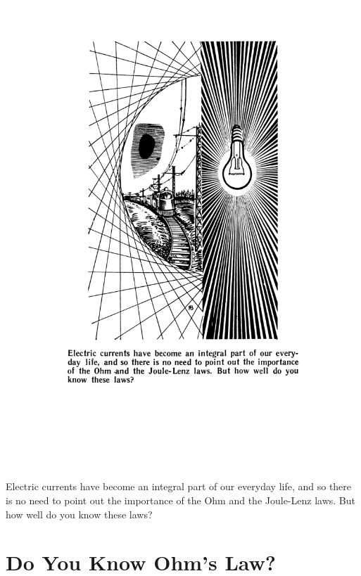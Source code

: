 \documentclass[a4paper,sfsidenotes]{tufte-book}
\begin{document}
\begin{figure}
\centering
\includegraphics[width=0.65\linewidth]{sec-j.pdf}
\end{figure}
\begin{fullwidth}
\begin{Large}
Electric currents have become an integral part of our everyday life, and so there is no need to point out the importance of the Ohm and the Joule-Lenz laws. But how well do you know these laws?
\end{Large}
\end{fullwidth}


\chapter{Do You Know Ohm's Law?}
\label{ch-27}
\end{document}

